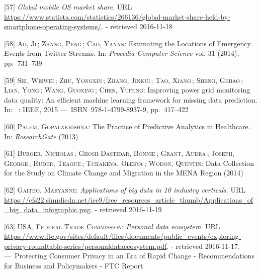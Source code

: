\documentclass[12pt,english,a4paper,titlepage,cleardoublepage=empty,dottedtoc]{report}
\begin{document}
\hypertarget{ref-graphic_2016_global-mobile-os-market-share}{}
{[}57{]} \emph{Global mobile OS market share}. URL
\url{https://www.statista.com/statistics/266136/global-market-share-held-by-smartphone-operating-systems/}.
- retrieved 2016-11-18

\hypertarget{ref-estimating-the-locations-of-emergency-events-from-twitter-streams_2014}{}
{[}58{]} \textsc{Ao, Ji}\,; \textsc{Zhang, Peng}\,; \textsc{Cao, Yanan}:
Estimating the Locations of Emergency Events from Twitter Streams. In:
\emph{Procedia Computer Science} vol. 31 (2014), pp.~731--739

\hypertarget{ref-paper_2015_improving-power-grid-monitoring-data-quality-an-efficient-machine-learning-framework-for-missing-data-prediction}{}
{[}59{]} \textsc{Shi, Weiwei}\,; \textsc{Zhu, Yongxin}\,; \textsc{Zhang,
Jinkui}\,; \textsc{Tao, Xiang}\,; \textsc{Sheng, Gehao}\,; \textsc{Lian,
Yong}\,; \textsc{Wang, Guoxing}\,; \textsc{Chen, Yufeng}: Improving
power grid monitoring data quality: An efficient machine learning
framework for missing data prediction. In: ~: IEEE, 2015
---~ISBN~978-1-4799-8937-9, pp.~417--422

\hypertarget{ref-the-practice-of-predictive-analytics-in-healthcare_2013}{}
{[}60{]} \textsc{Palem, Gopalakrishna}: The Practice of Predictive
Analytics in Healthcare. In: \emph{ResearchGate} (2013)

\hypertarget{ref-data-collection-for-climate-changes_2014}{}
{[}61{]} \textsc{Burger, Nicholas}\,; \textsc{Ghosh-Dastidar, Bonnie}\,;
\textsc{Grant, Audra}\,; \textsc{Joseph, George}\,; \textsc{Ruder,
Teague}\,; \textsc{Tchakeva, Olesya}\,; \textsc{Wodon, Quentin}: Data
Collection for the Study on Climate Change and Migration in the MENA
Region (2014)

\hypertarget{ref-graphic_2015_applications-of-big-data-in-10-industry-verticals}{}
{[}62{]} \textsc{Gaitho, Maryanne}: \emph{Applications of big data in 10
industry verticals}. URL
\url{https://cfs22.simplicdn.net/ice9/free_resources_article_thumb/Applications_of_big_data_infographic.png}.
- retrieved 2016-11-19

\hypertarget{ref-graphic_2012_personal-data-ecosystem}{}
{[}63{]} \textsc{USA, Federal Trade Commission}: \emph{Personal data
ecosystem}. URL
\url{https://www.ftc.gov/sites/default/files/documents/public_events/exploring-privacy-roundtable-series/personaldataecosystem.pdf}.
- retrieved 2016-11-17. ---~Protecting Consumer Privacy in an Era of
Rapid Change - Recommendations for Business and Policymakers - FTC
Report
\end{document}
